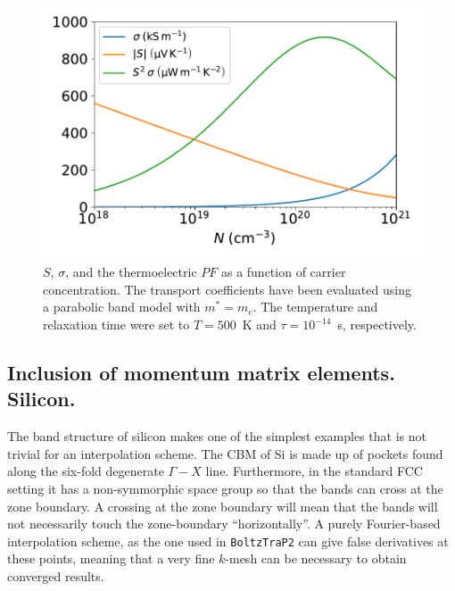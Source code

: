 \documentclass[final,5p,times,twocolumn,sort&compress]{elsarticle}
\begin{document}
\begin{figure}[htb]
\begin{center}
\includegraphics[width=.9\columnwidth]{3DHEG2}
\end{center}
\caption{$S$, $\sigma$, and the thermoelectric $PF$ as a function of carrier concentration. The transport coefficients have been evaluated using a parabolic band model with $m^*=m_e$. The temperature and relaxation time were set to $T=500$~K and $\tau=10^{-14}$~s, respectively. }
\label{fig:3DHEG2}
\end{figure}

\subsection{Inclusion of momentum matrix elements. Silicon.}
The band structure of silicon makes one of the simplest examples that is not trivial for an interpolation scheme. The CBM of Si is made up of pockets found along the six-fold degenerate $\Gamma-X$ line. Furthermore, in the standard FCC setting it has a non-symmorphic space group
so that the bands can cross at the zone boundary. A crossing at the zone boundary will mean that the bands will not necessarily touch the zone-boundary ``horizontally''. A purely Fourier-based interpolation scheme, as the one used in \texttt{BoltzTraP2} can give false derivatives at these points, meaning that a very fine $k$-mesh can be necessary to obtain converged results.
\end{document}
